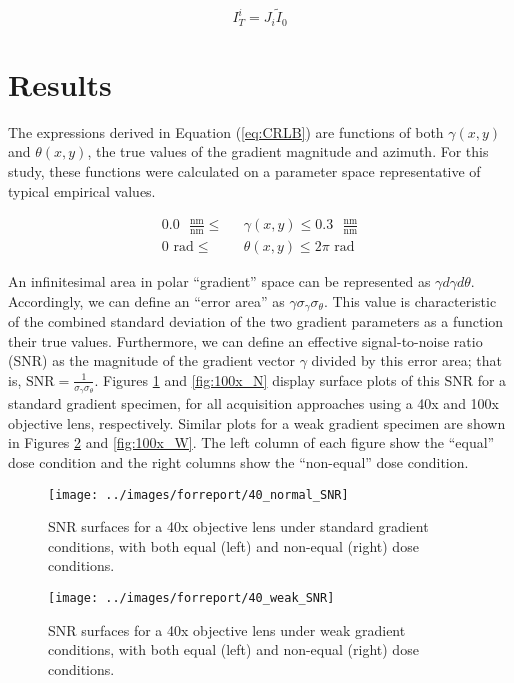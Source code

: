 \documentclass[aps, secnumarabic, amssymb, notitlepage]{article}
\begin{document}
\begin{equation*}
  I^i_T = J_i \tilde{I}_0
\end{equation*}


\section{Results}

The expressions derived in Equation (\ref{eq:CRLB}) are functions of both $\gamma(x,y)$ and $\theta(x,y)$, the true values of the gradient magnitude and azimuth. For this study, these functions were calculated on a parameter space representative of typical empirical values. 

\begin{align*}
  0.0 \text{ }\frac{\text{nm}}{\text{nm}} \le &\text{ }\gamma(x,y) \le 0.3 \text{ }\frac{\text{nm}}{\text{nm}} \\[6pt]
  0 \text{ rad} \le & \text{ }\theta(x,y) \le 2\pi \text{ rad}
\end{align*}

An infinitesimal area in polar ``gradient'' space can be represented as $\gamma d\gamma d\theta$. Accordingly, we can define an ``error area'' as $\gamma \sigma_{\gamma} \sigma_{\theta}$. This value is characteristic of the combined standard deviation of the two gradient parameters as a function their true values. Furthermore, we can define an effective signal-to-noise ratio (SNR) as the magnitude of the gradient vector $\gamma$ divided by this error area; that is, $\text{SNR} = \frac{1}{\sigma_{\gamma}\sigma_{\theta}}$. Figures \ref{fig:40x_N} and \ref{fig:100x_N} display surface plots of this SNR for a standard gradient specimen, for all acquisition approaches using a 40x and 100x objective lens, respectively. Similar plots for a weak gradient specimen are shown in Figures \ref{fig:40x_W} and \ref{fig:100x_W}. The left column of each figure show the ``equal'' dose condition and the right columns show the ``non-equal'' dose condition. 

\begin{figure}[H]
  \texttt{[image: ../images/forreport/40\_normal\_SNR]}
  \captionsetup{width=0.85\linewidth}
  \caption{SNR surfaces for a 40x objective lens under standard gradient conditions, with both equal (left) and non-equal (right) dose conditions. \label{fig:40x_N}}
\end{figure}

\begin{figure}[H]
  \texttt{[image: ../images/forreport/40\_weak\_SNR]}
  \captionsetup{width=0.85\linewidth}
  \caption{SNR surfaces for a 40x objective lens under weak gradient conditions, with both equal (left) and non-equal (right) dose conditions. \label{fig:40x_W}}
\end{figure}
  
\end{document}

